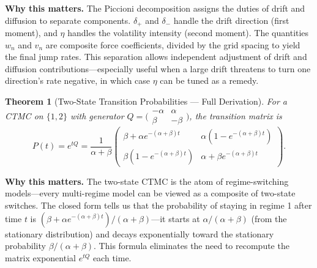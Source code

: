 \documentclass[11pt,a4paper,openany]{book}
\theoremstyle{definition}
\theoremstyle{plain}
\newtheorem{theorem}{Theorem}[chapter]
\theoremstyle{remark}
\newcommand{\1}{\mathbbm{1}}
\begin{document}
\medskip
\noindent\textbf{Why this matters.} The Piccioni decomposition assigns the duties of drift and diffusion to separate components. $\delta_+$ and $\delta_-$ handle the drift direction (first moment), and $\eta$ handles the volatility intensity (second moment). The quantities $w_n$ and $v_n$ are composite force coefficients, divided by the grid spacing to yield the final jump rates. This separation allows independent adjustment of drift and diffusion contributions---especially useful when a large drift threatens to turn one direction's rate negative, in which case $\eta$ can be tuned as a remedy.

\begin{theorem}[Two-State Transition Probabilities --- Full Derivation]
For a CTMC on $\{1,2\}$ with generator $Q = \bigl(\begin{smallmatrix} -\alpha & \alpha \\ \beta & -\beta \end{smallmatrix}\bigr)$, the transition matrix is
\[
P(t) = e^{tQ} = \frac{1}{\alpha+\beta} \begin{pmatrix}
\beta + \alpha e^{-(\alpha+\beta)t} & \alpha(1-e^{-(\alpha+\beta)t}) \\
\beta(1-e^{-(\alpha+\beta)t}) & \alpha + \beta e^{-(\alpha+\beta)t}
\end{pmatrix}.
\]
\end{theorem}

\medskip
\noindent\textbf{Why this matters.} The two-state CTMC is the atom of regime-switching models---every multi-regime model can be viewed as a composite of two-state switches. The closed form tells us that the probability of staying in regime 1 after time $t$ is $(\beta + \alpha e^{-(\alpha+\beta)t})/(\alpha+\beta)$---it starts at $\alpha/(\alpha+\beta)$ (from the stationary distribution) and decays exponentially toward the stationary probability $\beta/(\alpha+\beta)$. This formula eliminates the need to recompute the matrix exponential $e^{tQ}$ each time.
\end{document}
